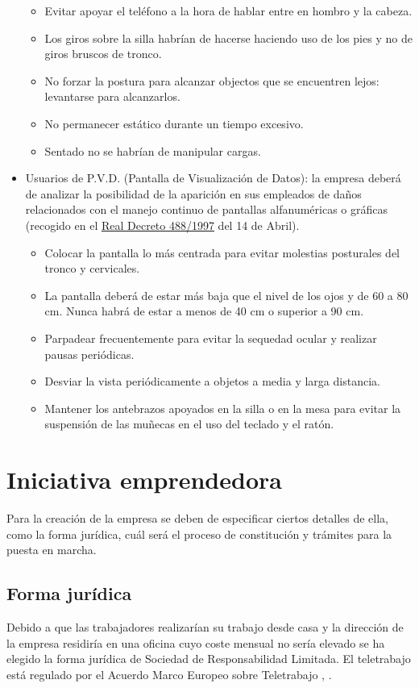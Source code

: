 \documentclass[12pt, a4paper]{book} %
\begin{document}
\begin{itemize}
\begin{itemize}
					\item Evitar apoyar el teléfono a la hora de hablar entre en hombro y la cabeza.
					\item Los giros sobre la silla habrían de hacerse haciendo uso de los pies y no de giros bruscos de tronco.
					\item No forzar la postura para alcanzar objectos que se encuentren lejos: levantarse para alcanzarlos.
					\item No permanecer estático durante un tiempo excesivo.
					\item Sentado no se habrían de manipular cargas.
				\end{itemize}
				\item Usuarios de P.V.D. (Pantalla de Visualización de Datos): la empresa deberá de analizar la posibilidad de la aparición en sus empleados de daños relacionados con el manejo continuo de pantallas alfanuméricas o gráficas (recogido en el \href{https://www.boe.es/buscar/doc.php?id=BOE-A-1997-8671}{Real Decreto 488/1997} del 14 de Abril).
				\begin{itemize}
					\item Colocar la pantalla lo más centrada para evitar molestias posturales del tronco y cervicales.
					\item La pantalla deberá de estar más baja que el nivel de los ojos y de 60 a 80 cm. Nunca habrá de estar a menos de 40 cm o superior a 90 cm.
					\item Parpadear frecuentemente para evitar la sequedad ocular y realizar pausas periódicas.
					\item Desviar la vista periódicamente a objetos a media y larga distancia.
					\item Mantener los antebrazos apoyados en la silla o en la mesa para evitar la suspensión de las muñecas en el uso del teclado y el ratón.
				\end{itemize}
			\end{itemize}
		\section{Iniciativa emprendedora}
		Para la creación de la empresa se deben de especificar ciertos detalles de ella, como la forma jurídica, cuál será el proceso de constitución y trámites para la puesta en marcha.
			\subsection{Forma jurídica}
			Debido a que las trabajadores realizarían su trabajo desde casa y la dirección de la empresa residiría en una oficina cuyo coste mensual no sería elevado se ha elegido la forma jurídica de Sociedad de Responsabilidad Limitada. El teletrabajo está regulado por el Acuerdo Marco Europeo sobre Teletrabajo \cite{Teletrabajo_en_Espana_acuerdo_marco_y_administracion_publica}, \cite{Telefonica_Espana}.
\end{document}
